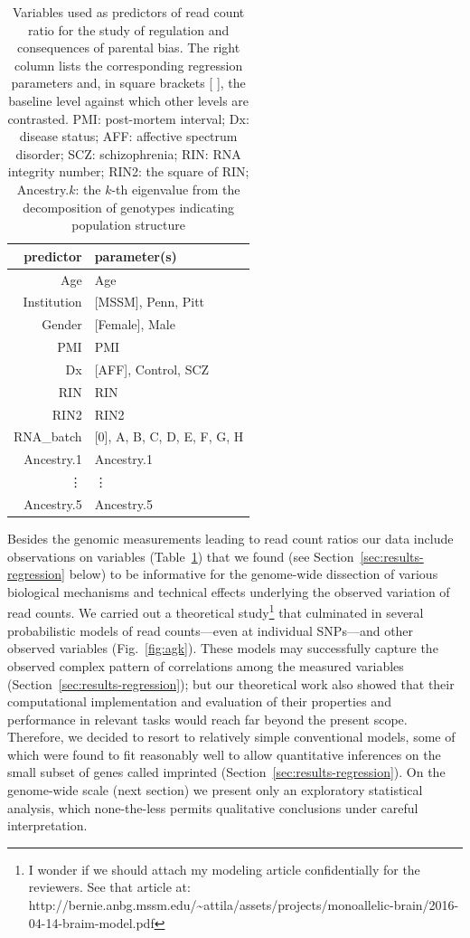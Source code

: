 \documentclass[letterpaper]{article}
\begin{document}
\begin{table}
\begin{center}
\begin{tabular}{r|l}
predictor & parameter(s)\\
\hline
Age & Age\\
Institution & [MSSM], Penn, Pitt\\
Gender & [Female], Male\\
PMI & PMI\\
Dx & [AFF], Control, SCZ\\
RIN & RIN\\
RIN2 & RIN2\\
RNA\_batch & [0], A, B, C, D, E, F, G, H\\
Ancestry.1 & Ancestry.1\\
\vdots & \vdots \\
Ancestry.5 & Ancestry.5\\
\end{tabular}
\caption{Variables used as predictors of read count ratio for the study of
regulation and consequences of parental bias.  The right column lists the
corresponding regression parameters and, in square brackets [ ], the baseline
level against which other levels are contrasted.  PMI: post-mortem interval; Dx:
disease status; AFF: affective spectrum disorder; SCZ: schizophrenia; RIN: RNA
integrity number; RIN2: the square of RIN; Ancestry.\(k\): the \(k\)-th
eigenvalue from the decomposition of genotypes indicating population structure}
\label{tab:predictors}
\end{center}
\end{table}

Besides the genomic measurements leading to read count ratios our data include
observations on variables (Table~\ref{tab:predictors}) that we found (see
Section~\ref{sec:results-regression} below) to be informative for the genome-wide
dissection of various biological mechanisms and technical effects underlying
the observed variation of read counts.  We carried out a theoretical
study\footnote{I wonder if we should attach my modeling article confidentially
for the reviewers.  See that article
at:\\http://bernie.anbg.mssm.edu/\~{}attila/assets/projects/monoallelic-brain/2016-04-14-braim-model.pdf}
that culminated in several probabilistic models of read counts---even at
individual SNPs---and other observed variables (Fig.~\ref{fig:agk}).  These
models may successfully capture the observed complex pattern of correlations
among the measured variables (Section~\ref{sec:results-regression}); but our
theoretical work also showed that their computational implementation and
evaluation of their properties and performance in relevant tasks would reach
far beyond the present scope.  Therefore, we decided to resort to relatively
simple conventional models, some of which were found to fit reasonably well to
allow quantitative inferences on the small subset of genes called imprinted
(Section~\ref{sec:results-regression}).  On the genome-wide scale (next section) we
present only an exploratory statistical analysis, which none-the-less permits
qualitative conclusions under careful interpretation.
\end{document}
